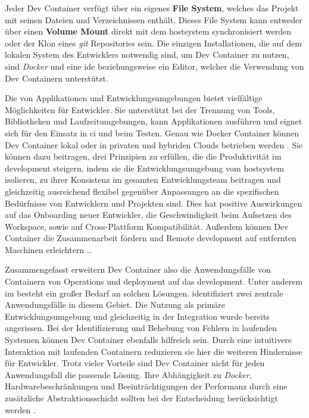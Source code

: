 Jeder Dev Container verfügt über ein eigenes \textbf{File System}, welches das Projekt mit seinen Dateien und Verzeichnissen enthält. Dieses File System kann entweder über einen \textbf{Volume Mount} direkt mit dem \Gls{hostsystem} synchronisiert werden oder der Klon eines \textit{\Gls{git}} Repositories sein. Die einzigen Installationen, die auf dem lokalen System des Entwicklers notwendig sind, um Dev Container zu nutzen, sind \textit{Docker} und eine \Gls{ide} beziehungsweise ein Editor, welcher die Verwendung von Dev Containern unterstützt.

Die  von Applikationen und Entwicklungsumgebungen bietet vielfältige Möglichkeiten für Entwickler. Sie unterstützt bei der Trennung von Tools, Bibliotheken und Laufzeitumgebungen, kann Applikationen ausführen und eignet sich für den Einsatz in \acrfull{ci} und beim Testen. Genau wie Docker Container können Dev Container lokal oder in privaten und hybriden Clouds betrieben werden \cite{306:Development-Containers}. Sie können dazu beitragen, drei Prinzipien zu erfüllen, die die Produktivität im \Gls{development} steigern, indem sie die Entwicklungsumgebung vom \Gls{hostsystem} isolieren, zu ihrer Konsistenz im gesamten Entwicklungsteam beitragen und gleichzeitig ausreichend flexibel gegenüber Anpassungen an die spezifischen Bedürfnisse von Entwicklern und Projekten sind. Dies hat positive Auswirkungen auf das Onboarding neuer Entwickler, die Geschwindigkeit beim Aufsetzen des Workspace, sowie auf Cross-Plattform Kompatibilität. Außerdem können Dev Container die Zusammenarbeit fördern und Remote \Gls{development} auf entfernten Maschinen erleichtern \cite{200:Dev-Containers-Future-of-Development-Environments,202:Maximizing-Efficiency-with-Dev-Containers,305:Using-DevContainers-in-JetBrains-IDEs}..

Zusammengefasst erweitern Dev Container also die Anwendungsfälle von Containern von Operations und \Gls{deployment} auf das \Gls{development}. Unter anderem im  besteht ein großer Bedarf an solchen Lösungen. \citeauthor{202:Maximizing-Efficiency-with-Dev-Containers} identifiziert zwei zentrale Anwendungsfälle in diesem Gebiet. Die Nutzung als primäre Entwicklungsumgebung und gleichzeitig in der Integration wurde bereits angerissen. Bei der Identifizierung und Behebung von Fehlern in laufenden Systemen können Dev Container ebenfalls hilfreich sein. Durch eine intuitivere Interaktion mit laufenden Containern reduzieren sie hier die weiteren Hindernisse für Entwickler. Trotz vieler Vorteile sind Dev Container nicht für jeden Anwendungsfall die passende Lösung. Ihre Abhängigkeit zu \textit{Docker}, Hardwarebeschränkungen und Beeinträchtigungen der Performanz durch eine zusätzliche Abstraktionsschicht sollten bei der Entscheidung berücksichtigt werden \cite{202:Maximizing-Efficiency-with-Dev-Containers}.

